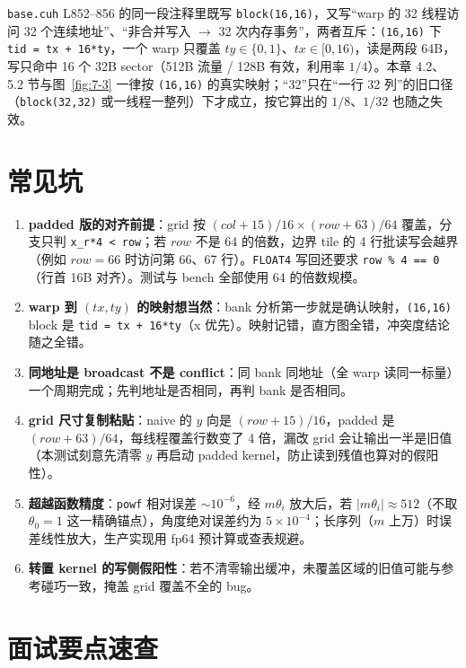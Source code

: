 \begin{kaogu}
\texttt{base.cuh} L852--856 的同一段注释里既写 \texttt{block(16,16)}，又写“warp 的 32 线程访问 32 个连续地址”、“非合并写入 $\to$ 32 次内存事务”，两者互斥：\texttt{(16,16)} 下 \texttt{tid = tx + 16*ty}，一个 warp 只覆盖 $ty\in\{0,1\}$、$tx\in[0,16)$，读是两段 64B，写只命中 16 个 32B sector（512B 流量 / 128B 有效，利用率 $1/4$）。本章 4.2、5.2 节与图~\ref{fig:7-3} 一律按 \texttt{(16,16)} 的真实映射；“32”只在“一行 32 列”的旧口径（\texttt{block(32,32)} 或一线程一整列）下才成立，按它算出的 $1/8$、$1/32$ 也随之失效。
\end{kaogu}

\section{常见坑}

\begin{enumerate}
  \item \textbf{padded 版的对齐前提}：grid 按 $(col+15)/16 \times (row+63)/64$ 覆盖，分支只判 \texttt{x\_r*4 < row}；若 $row$ 不是 64 的倍数，边界 tile 的 4 行批读写会越界（例如 $row = 66$ 时访问第 66、67 行）。\texttt{FLOAT4} 写回还要求 \texttt{row \% 4 == 0}（行首 16B 对齐）。测试与 bench 全部使用 64 的倍数规模。
  \item \textbf{warp 到 $(tx,ty)$ 的映射想当然}：bank 分析第一步就是确认映射，\texttt{(16,16)} block 是 \texttt{tid = tx + 16*ty}（x 优先）。映射记错，直方图全错，冲突度结论随之全错。
  \item \textbf{同地址是 broadcast 不是 conflict}：同 bank 同地址（全 warp 读同一标量）一个周期完成；先判地址是否相同，再判 bank 是否相同。
  \item \textbf{grid 尺寸复制粘贴}：naive 的 $y$ 向是 $(row+15)/16$，padded 是 $(row+63)/64$，每线程覆盖行数变了 4 倍，漏改 grid 会让输出一半是旧值（本测试刻意先清零 $y$ 再启动 padded kernel，防止读到残值也算对的假阳性）。
  \item \textbf{超越函数精度}：\texttt{powf} 相对误差 $\sim 10^{-6}$，经 $m\theta_i$ 放大后，若 $|m\theta_i|\approx512$（不取 $\theta_0=1$ 这一精确锚点），角度绝对误差约为 $5\times10^{-4}$；长序列（$m$ 上万）时误差线性放大，生产实现用 fp64 预计算或查表规避。
  \item \textbf{转置 kernel 的写侧假阳性}：若不清零输出缓冲，未覆盖区域的旧值可能与参考碰巧一致，掩盖 grid 覆盖不全的 bug。
\end{enumerate}

\section{面试要点速查}

